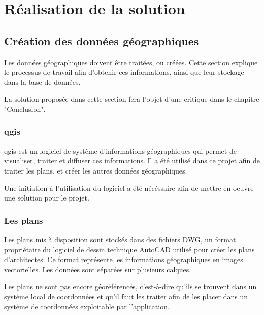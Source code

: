 \documentclass[
    iai, %
    il, %
]{heig-tb}
\begin{document}
\chapter{Réalisation de la solution}

\section{Création des données géographiques}

Les données géographiques doivent être traitées, ou créées.
Cette section explique le processus de travail afin d'obtenir ces informations, ainsi que leur stockage dans la base de données.

La solution proposée dans cette section fera l'objet d'une critique dans le chapitre "Conclusion".

\subsection{\gls{qgis}}
\gls{qgis} est un logiciel de système d'informations géographiques qui permet de visualiser, traiter et diffuser ces informations.
Il a été utilisé dans ce projet afin de traiter les plans, et créer les autres données géographiques.

Une initiation à l'utilisation du logiciel a été nécéssaire afin de mettre en oeuvre une solution pour le projet.

\subsection{Les plans}
Les plans mis à disposition sont stockés dans des fichiers DWG, un format propriétaire du logiciel de dessin technique AutoCAD utilisé pour créer les plans d'architectes.
Ce format représente les informations géographiques en images vectorielles.
Les données sont séparées sur plusieurs calques.

Les plans ne sont pas encore géoréférencés, c'est-à-dire qu'ils se trouvent dans un système local de coordonnées
et qu'il faut les traiter afin de les placer dans un système de coordonnées exploitable par l'application.
\end{document}
